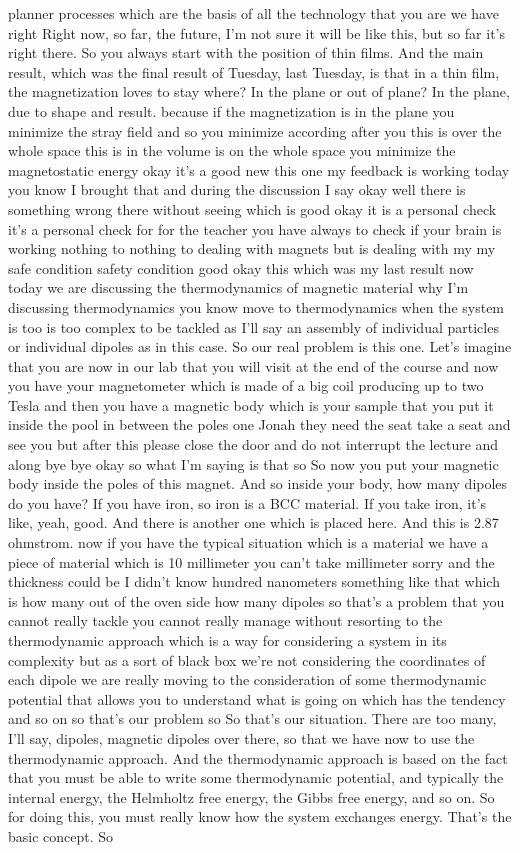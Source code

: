 planner processes which are the basis of all the technology that you are we have right Right now, so far, the future, I'm not sure it will be like this, but so far it's right there. So you always start with the position of thin films. And the main result, which was the final result of Tuesday, last Tuesday, is that in a thin film, the magnetization loves to stay where? In the plane or out of plane? In the plane, due to shape and result. because if the magnetization is in the plane you minimize the stray field and so you minimize according after you this is over the whole space this is in the volume is on the whole space you minimize the magnetostatic energy okay it's a good new this one my feedback is working today you know I brought that and during the discussion I say okay well there is something wrong there without seeing which is good okay it is a personal check it's a personal check for for the teacher you have always to check if your brain is working nothing to nothing to dealing with magnets but is dealing with my my safe condition safety condition good okay this which was my last result now today we are discussing the thermodynamics of magnetic material why I'm discussing thermodynamics you know move to thermodynamics when the system is too is too complex to be tackled as I'll say an assembly of individual particles or individual dipoles as in this case. So our real problem is this one. Let's imagine that you are now in our lab that you will visit at the end of the course and now you have your magnetometer which is made of a big coil producing up to two Tesla and then you have a magnetic body which is your sample that you put it inside the pool in between the poles one Jonah they need the seat take a seat and see you but after this please close the door and do not interrupt the lecture and along bye bye okay so what I'm saying is that so So now you put your magnetic body inside the poles of this magnet. And so inside your body, how many dipoles do you have? If you have iron, so iron is a BCC material. If you take iron, it's like, yeah, good. And there is another one which is placed here. And this is 2.87 ohmstrom. now if you have the typical situation which is a material we have a piece of material which is 10 millimeter you can't take millimeter sorry and the thickness could be I didn't know hundred nanometers something like that which is how many out of the oven side how many dipoles so that's a problem that you cannot really tackle you cannot really manage without resorting to the thermodynamic approach which is a way for considering a system in its complexity but as a sort of black box we're not considering the coordinates of each dipole we are really moving to the consideration of some thermodynamic potential that allows you to understand what is going on which has the tendency and so on so that's our problem so So that's our situation. There are too many, I'll say, dipoles, magnetic dipoles over there, so that we have now to use the thermodynamic approach. And the thermodynamic approach is based on the fact that you must be able to write some thermodynamic potential, and typically the internal energy, the Helmholtz free energy, the Gibbs free energy, and so on. So for doing this, you must really know how the system exchanges energy. That's the basic concept. So 